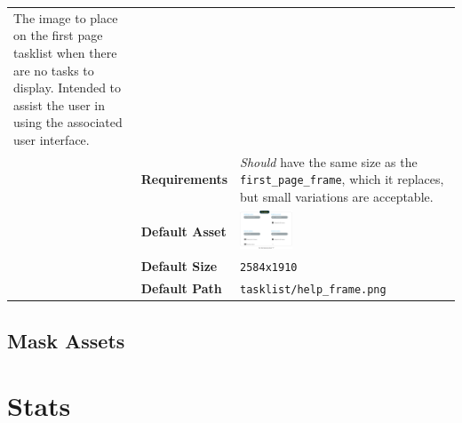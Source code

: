 \documentclass[a4paper, 10pt]{report}
\begin{document}
\begin{longtable}{| p{} p{} p{}|}
{    The image to place on the first page tasklist when there are no tasks to display.
    Intended to assist the user in using the associated user interface.
  }\\
  & \textbf{Requirements} & \emph{Should} have the same size as the \texttt{first\_page\_frame}, which it replaces, but small variations are acceptable.\\
  & \textbf{Default Asset} & \centering\arraybackslash\includegraphics[width=0.25\textwidth, valign=m]{../base/assets/tasklist/help_frame.png}\\
  & \textbf{Default Size} & \texttt{2584x1910}\\
  & \textbf{Default Path} & \texttt{tasklist/help\_frame.png}\\
  \hline
\end{longtable}
\subsection{Mask Assets}
\section{Stats}
\end{document}
